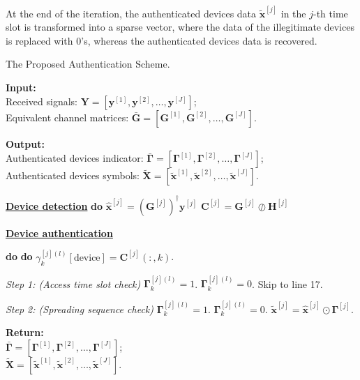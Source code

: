 \documentclass[journal,10pt]{IEEEtran}
\begin{document}
At the end of the iteration, the authenticated devices data $\tilde{\mathbf{x}}^{[j]}$ in the $j$-th time slot is transformed into a sparse vector, where the data of the illegitimate devices is replaced with $0$'s, whereas the authenticated devices data is recovered. 

\begin{algorithm}[t]
		\caption{The Proposed Authentication Scheme.}
        \textbf{Input:}\\ 
         Received signals: $\mathbf{Y} = \left[\mathbf{y}^{[1]}, \mathbf{y}^{[2]}, \hdots, \mathbf{y}^{[J]} \right] $;\\
         Equivalent channel matrices: $\bar{\mathbf{G}} = \left[\mathbf{G}^{[1]}, \mathbf{G}^{[2]}, \hdots, \mathbf{G}^{[J]}\right]$. 
		
		\textbf{Output:}\\ 
		Authenticated devices indicator: $\bar{\mathbf{\Gamma}} = \left[ \mathbf{\Gamma}^{[1]}, \mathbf{\Gamma}^{[2]}, \hdots, \mathbf{\Gamma}^{[J]} \right] $;\\
		Authenticated devices symbols: $\tilde{\mathbf{X}} = \left[ \tilde{\mathbf{x}}^{[1]}, \tilde{\mathbf{x}}^{[2]}, \hdots, \tilde{\mathbf{x}}^{[J]} \right] $.      
		
	\begin{algorithmic}[1]
	        \Statex \textbf{\underline{Device detection}}
	         \textbf{do}
	            \State $\hat{\mathbf{x}}^{[j]} = \left( \mathbf{G}^{[j]} \right)^\dagger \mathbf{y}^{[j]}$
	            \State $\mathbf{C}^{[j]} = \mathbf{G}^{[j]} \oslash \mathbf{H}^{[j]}$

            \Statex \textbf{\underline{Device authentication}}
            
             \textbf{do}
             \textbf{do}
            \State $\gamma_k^{[j](l)}[\text{device}] = \mathbf{C}^{[j]}(:,k)$.
            
            \Statex \textit{Step 1: (Access time slot check)}
			    \State $\mathbf{\Gamma}^{[j](l)}_k = 1$.
			\Else 
			    \State $\mathbf{\Gamma}^{[j](l)}_k = 0$.
			    \State Skip to line 17.
			\EndIf			
            
            \Statex \textit{Step 2: (Spreading sequence check)}
			    \State $\mathbf{\Gamma}^{[j](l)}_k = 1$.
			\Else 
			    \State $\mathbf{\Gamma}^{[j](l)}_k = 0$.
			\EndIf
			\EndFor
			\EndFor
			\State $\tilde{\mathbf{x}}^{[j]} = \hat{\mathbf{x}}^{[j]}  \odot \mathbf{\Gamma}^{[j]}$.
			\EndFor
			
\end{algorithmic}
\textbf{Return:} \\$\bar{\mathbf{\Gamma}} = \left[ \mathbf{\Gamma}^{[1]}, \mathbf{\Gamma}^{[2]}, \hdots, \mathbf{\Gamma}^{[J]} \right]$;\\
$\tilde{\mathbf{X}} = \left[ \tilde{\mathbf{x}}^{[1]}, \tilde{\mathbf{x}}^{[2]}, \hdots, \tilde{\mathbf{x}}^{[J]} \right]$.  
\end{algorithm}
\end{document}
